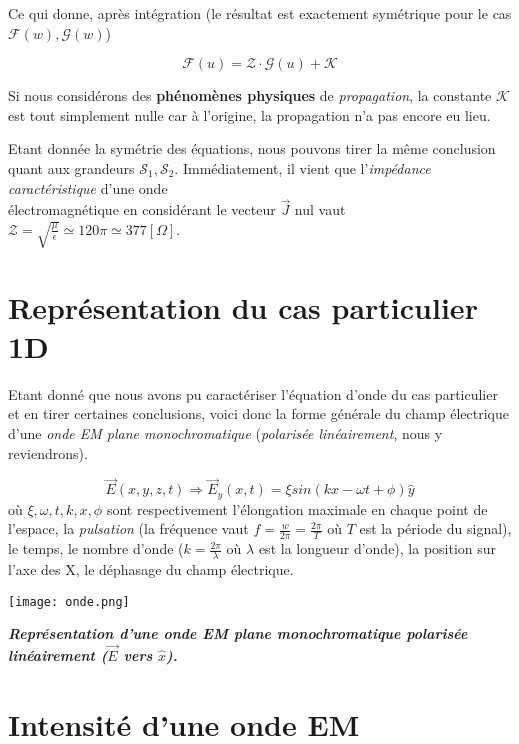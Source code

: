 Ce qui donne, après intégration (le résultat est exactement symétrique pour le cas $\mathcal{F}(w), \mathcal{G}(w)$) 

\[\mathcal{F}(u) = \mathcal{Z} \cdot \mathcal{G}(u) + \mathcal{K}\]

Si nous considérons des \textbf{phénomènes physiques} de \textit{propagation}, la constante $\mathcal{K}$ est tout simplement nulle car 
à l'origine, la propagation n'a pas encore eu lieu. 


Etant donnée la symétrie des équations, nous pouvons tirer la même conclusion quant aux grandeurs $\mathcal{S}_{1},\mathcal{S}_{2}$. 
Immédiatement, il vient que l'\textit{impédance caractéristique} d'une onde\\ électromagnétique en considérant le vecteur $\vec{J}$ nul vaut 
$\mathcal{Z} = \sqrt{\frac{\mu}{\epsilon}} \simeq120 \pi \simeq 377 [\Omega] $. 

\section{Représentation du cas particulier 1D}

Etant donné que nous avons pu caractériser l'équation d'onde du cas particulier et en tirer certaines conclusions, 
voici donc la forme générale du champ électrique d'une \textit{onde EM plane monochromatique} (\textit{polarisée linéairement}, nous y reviendrons).

\[\vec{E}(x,y,z,t) \Rightarrow \vec{E}_{y}(x,t) = \xi sin(k x - \omega t + \phi) \hat{y} \]
où $\xi,\omega,t,k,x,\phi$ sont respectivement l'élongation maximale en chaque point de l'espace, la \textit{pulsation} (la fréquence  vaut $f = \frac{w}{2 \pi} = \frac{2\pi}{T}$ où $T$ 
est la période du signal), le temps, le nombre d'onde ($k = \frac{2\pi}{\lambda}$ où $\lambda$ est la longueur d'onde), la position sur l'axe des X, le déphasage  du champ électrique. 
\begin{marginfigure}
\texttt{[image: onde.png]}
\caption{\textit{\textbf{Représentation d'une onde EM plane monochromatique polarisée linéairement ($\vec{E}$ vers $\hat{x}$).}}}
\end{marginfigure}




\section{Intensité d'une onde EM}  %

